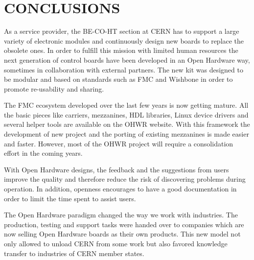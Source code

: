 \documentclass{JAC2003}
\begin{document}
\section{CONCLUSIONS}
As a service provider, the BE-CO-HT section at CERN has to support a large variety of electronic modules and continuously design new boards to replace the obsolete ones.
In order to fulfill this mission with limited human resources the next generation of control boards have been developed in an Open Hardware way, sometimes in collaboration with external partners.
The new kit was designed to be modular and based on standards such as FMC and Wishbone in order to promote re-usability and sharing.

The FMC ecosystem developed over the last few years is now getting mature.
All the basic pieces like carriers, mezzanines, HDL libraries, Linux device drivers and several helper tools are available on the OHWR website.
With this framework the development of new project and the porting of existing mezzanines is made easier and faster.
However, most of the OHWR project will require a consolidation effort in the coming years.

With Open Hardware designs, the feedback and the suggestions from users improve the quality and therefore reduce the risk of discovering problems during operation.
In addition, openness encourages to have a good documentation in order to limit the time spent to assist users.

The Open Hardware paradigm changed the way we work with industries. The production, testing and support tasks were handed over to companies which are now selling Open Hardware boards as their own products.
This new model not only allowed to unload CERN from some work but also favored knowledge transfer to industries of CERN member states.
\end{document}
